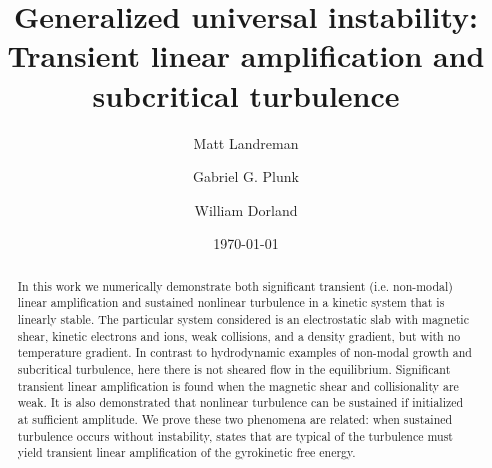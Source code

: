\documentclass[12pt,superscriptaddress]{revtex4}
\begin{document}
\title{Generalized universal instability: Transient linear amplification and subcritical turbulence}




\author{Matt Landreman}
\author{Gabriel G. Plunk}
\author{William Dorland}


\date{\today}

\begin{abstract}

In this work we numerically demonstrate both significant transient (i.e. non-modal) linear amplification
and sustained nonlinear turbulence
in a kinetic system that is linearly stable.
The particular system considered is an electrostatic slab
with magnetic shear, kinetic electrons and ions,
weak collisions,
and a density gradient, but with no temperature gradient.
In contrast to hydrodynamic examples of non-modal growth and subcritical turbulence,
here there is not sheared flow in the equilibrium.
Significant transient linear amplification
is found when the magnetic shear and collisionality are weak.
It is also demonstrated that nonlinear turbulence can be sustained if initialized
at sufficient amplitude.
We prove these two phenomena are related:
when sustained turbulence occurs without instability,
states that are typical of the turbulence must
yield transient linear amplification of the gyrokinetic free energy.

\end{abstract}
\end{document}
